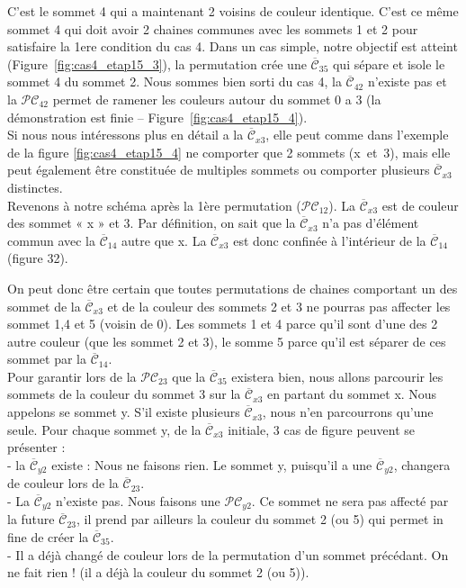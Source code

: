 \documentclass[french]{report}
\begin{document}
\begin{description}
C’est le sommet 4 qui a maintenant 2 voisins de couleur identique. C’est ce même sommet 4
qui doit avoir 2 chaines communes avec les sommets 1 et 2 pour satisfaire la 1ere condition du cas 4. 
Dans un cas simple, notre objectif est atteint  (Figure~\ref{fig:cas4_etap15_3}), la permutation crée une $\overline{\mathcal{C}}_{35}$ qui sépare et isole le sommet 4 du sommet 2. Nous sommes bien sorti du cas 4, la $\overline{\mathcal{C}}_{42}$ n’existe pas et la $\mathcal{PC}_{42}$ permet de ramener les couleurs autour du sommet 0 a 3  (la démonstration est finie – Figure~\ref{fig:cas4_etap15_4}).\\

%
%
%
%
Si nous nous intéressons plus en détail a la $\overline{\mathcal{C}}_{x3}$, elle peut comme dans l'exemple de la figure \ref{fig:cas4_etap15_4} ne comporter que 2 sommets (x~et~3), mais elle peut également être constituée de multiples sommets ou comporter plusieurs $\overline{\mathcal{C}}_{x3}$ distinctes.\\

Revenons à notre schéma après la 1ère permutation (${\mathcal{PC}}_{12}$). La $\overline{\mathcal{C}}_{x3}$ est de couleur des sommet « x » et 3. Par définition, on sait que la $\overline{\mathcal{C}}_{x3}$ n’a pas d’élément commun avec la $\overline{\mathcal{C}}_{14}$ autre que x. La $\overline{\mathcal{C}}_{x3}$ est donc confinée à l’intérieur de la $\overline{\mathcal{C}}_{14}$ (figure 32).

On peut donc être certain que toutes permutations de chaines comportant un des sommet de la $\overline{\mathcal{C}}_{x3}$ et de la couleur des sommets 2 et 3 ne pourras pas affecter les sommet 1,4 et 5 (voisin de 0). Les sommets 1 et 4 parce qu’il sont d'une des 2 autre couleur (que les sommet 2 et 3), le somme 5 parce qu’il est séparer de ces sommet par la $\overline{\mathcal{C}}_{14}$.\\

Pour garantir lors de la ${\mathcal{PC}}_{23}$ que la $\overline{\mathcal{C}}_{35}$ existera bien, nous allons parcourir les sommets de la couleur du sommet 3 sur la $\overline{\mathcal{C}}_{x3}$ en partant du sommet x. Nous appelons se sommet y. S'il existe plusieurs $\overline{\mathcal{C}}_{x3}$, nous n'en parcourrons qu'une seule. 
Pour chaque sommet y, de la $\overline{\mathcal{C}}_{x3}$ initiale, 3 cas de figure peuvent se présenter :\\
- la $\overline{\mathcal{C}}_{y2}$ existe : Nous ne faisons rien. Le sommet y, puisqu'il a une $\overline{\mathcal{C}}_{y2}$, changera de couleur lors de la $\overline{\mathcal{C}}_{23}$.\\
- La $\overline{\mathcal{C}}_{y2}$ n'existe pas. Nous faisons une ${\mathcal{PC}}_{y2}$. Ce sommet ne sera pas affecté par la future $\overline{\mathcal{C}}_{23}$, il prend par ailleurs la couleur du sommet 2 (ou 5) qui permet in fine de créer la $\overline{\mathcal{C}}_{35}$.\\
- Il a déjà changé de couleur lors de la permutation d'un sommet précédant. On ne fait rien ! (il a déjà la couleur du sommet 2 (ou 5)).\\



\end{description}
\end{document}
